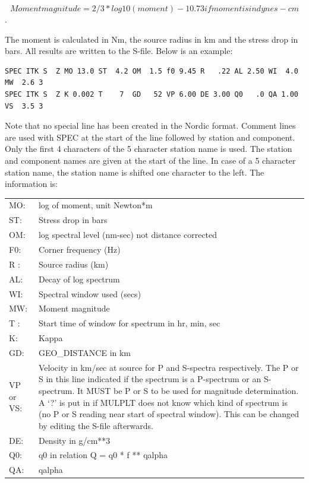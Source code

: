 \begin{displaymath}
Moment magnitude = 2/3 * log10(moment) -10.73 if moment is in dynes-cm 
\end{displaymath}
\citep{kanamori1977}. 

The moment is calculated in Nm, the source radius in km and the stress drop in bars. All results are written to the S-file. Below is an example: 

\begin{verbatim}
SPEC ITK S  Z MO 13.0 ST  4.2 OM  1.5 f0 9.45 R   .22 AL 2.50 WI  4.0 MW  2.6 3
SPEC ITK S  Z K 0.002 T    7  GD   52 VP 6.00 DE 3.00 Q0   .0 QA 1.00 VS  3.5 3
\end{verbatim}

Note that no special line has been created in the Nordic format. Comment lines are used with SPEC at the start of the line followed by station and component. Only the first 4 characters of the 5 character 
station name is used. The station and component names are given at the start of the line. In case of
a 5 character station name, the station name is shifted one character to the left.
The information is: 

\begin{tabular}{|lp{9cm}|}
\hline
MO: & log of moment, unit Newton*m \\
ST: & Stress drop in bars \\
OM: & log spectral level (nm-sec) %
not distance corrected \\
F0: & Corner frequency (Hz) \\
R : & Source radius (km) \\
AL: & Decay of log spectrum \\
WI: & Spectral window used (secs) \index{Corner frequency} \\
MW: & Moment magnitude \index{Moment} \\
T : & Start time of window for spectrum in hr, min, sec \\
K: & Kappa \index{Stress drop} \\
GD: & GEO\_DISTANCE in km \\
VP or VS: & Velocity in km/sec at source for P and S-spectra 
respectively. The P or S in this line 
indicated if the spectrum is a P-spectrum or an S-spectrum. 
It MUST be P or S to be used for magnitude determination. 
A `?' is put in if MULPLT does not know which kind of spectrum is (no P or S reading near start of spectral window). This can be changed by editing the S-file afterwards. \\
DE: & Density in g/cm**3 \\
Q0: & q0 in relation Q = q0 * f ** qalpha \\
QA: & qalpha \\
\hline
\end{tabular}
\newline


